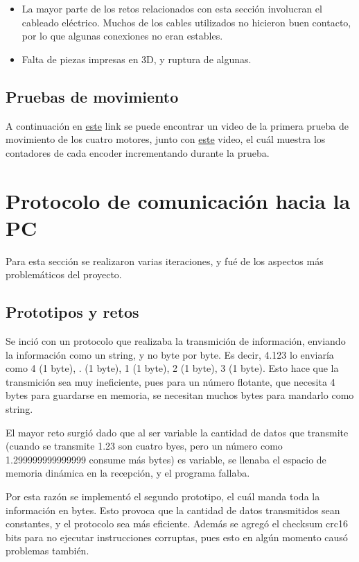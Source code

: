 \begin{itemize}
\item La mayor parte de los retos relacionados con esta sección involucran el cableado eléctrico. Muchos de los cables utilizados no hicieron buen contacto, por lo que algunas conexiones no eran estables.
\item Falta de piezas impresas en 3D, y ruptura de algunas.
\end{itemize}

\subsection{Pruebas de movimiento}

A continuación en \href{https://photos.app.goo.gl/sycSZ52LNMN4YrVcA}{este} link se puede encontrar un video de la primera prueba de movimiento de los cuatro motores, junto con \href{https://photos.app.goo.gl/4x4wTcnVmySGP9ELA}{este} video, el cuál muestra los contadores de cada encoder incrementando durante la prueba.

\section{Protocolo de comunicación hacia la PC}

Para esta sección se realizaron varias iteraciones, y fué de los aspectos más problemáticos del proyecto.

\subsection{Prototipos y retos}

Se inció con un protocolo que realizaba la transmición de información, enviando la información como un string, y no byte por byte. Es decir, 4.123 lo enviaría como 4 (1 byte), . (1 byte), 1 (1 byte), 2 (1 byte), 3 (1 byte). Esto hace que la transmición sea muy ineficiente, pues para un número flotante, que necesita 4 bytes para guardarse en memoria, se necesitan muchos bytes para mandarlo como string.

El mayor reto surgió dado que al ser variable la cantidad de datos que transmite (cuando se transmite 1.23 son cuatro byes, pero un número como 1.299999999999999 consume más bytes) es variable, se llenaba el espacio de memoria dinámica en la recepción, y el programa fallaba.

Por esta razón se implementó el segundo prototipo, el cuál manda toda la información en bytes. Esto provoca que la cantidad de datos transmitidos sean constantes, y el protocolo sea más eficiente. Además se agregó el checksum crc16 bits para no ejecutar instrucciones corruptas, pues esto en algún momento causó problemas también.

